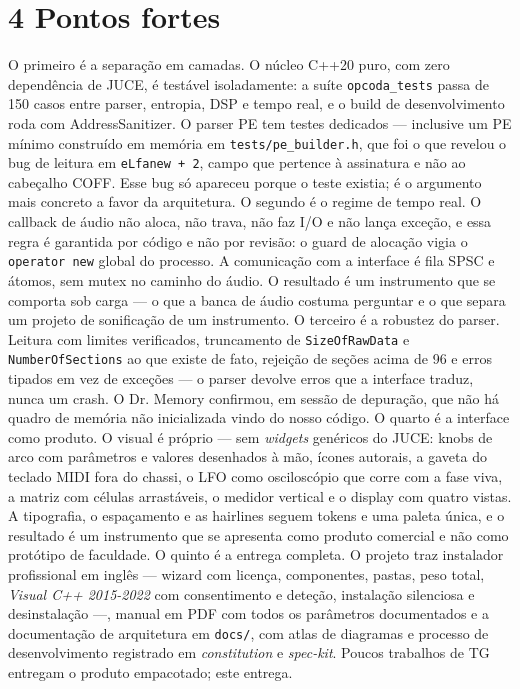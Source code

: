 \documentclass[11pt,a4paper]{article}
\newcommand{\code}[1]{\texttt{\small #1}}
\begin{document}
\section*{4 Pontos fortes}
O primeiro é a separação em camadas. O núcleo C++20 puro, com zero dependência de JUCE, é testável isoladamente: a suíte \code{opcoda\_tests} passa de 150 casos entre parser, entropia, DSP e tempo real, e o build de desenvolvimento roda com AddressSanitizer. O parser PE tem testes dedicados --- inclusive um PE mínimo construído em memória em \code{tests/pe\_builder.h}, que foi o que revelou o bug de leitura em \code{eLfanew + 2}, campo que pertence à assinatura e não ao cabeçalho COFF. Esse bug só apareceu porque o teste existia; é o argumento mais concreto a favor da arquitetura. O segundo é o regime de tempo real. O callback de áudio não aloca, não trava, não faz I/O e não lança exceção, e essa regra é garantida por código e não por revisão: o guard de alocação vigia o \code{operator new} global do processo. A comunicação com a interface é fila SPSC e átomos, sem mutex no caminho do áudio. O resultado é um instrumento que se comporta sob carga --- o que a banca de áudio costuma perguntar e o que separa um projeto de sonificação de um instrumento. O terceiro é a robustez do parser. Leitura com limites verificados, truncamento de \code{SizeOfRawData} e \code{NumberOfSections} ao que existe de fato, rejeição de seções acima de 96 e erros tipados em vez de exceções --- o parser devolve erros que a interface traduz, nunca um crash. O Dr. Memory confirmou, em sessão de depuração, que não há quadro de memória não inicializada vindo do nosso código. O quarto é a interface como produto. O visual é próprio --- sem \emph{widgets} genéricos do JUCE: knobs de arco com parâmetros e valores desenhados à mão, ícones autorais, a gaveta do teclado MIDI fora do chassi, o LFO como osciloscópio que corre com a fase viva, a matriz com células arrastáveis, o medidor vertical e o display com quatro vistas. A tipografia, o espaçamento e as hairlines seguem tokens e uma paleta única, e o resultado é um instrumento que se apresenta como produto comercial e não como protótipo de faculdade. O quinto é a entrega completa. O projeto traz instalador profissional em inglês --- wizard com licença, componentes, pastas, peso total, \emph{Visual C++ 2015-2022} com consentimento e deteção, instalação silenciosa e desinstalação ---, manual em PDF com todos os parâmetros documentados e a documentação de arquitetura em \code{docs/}, com atlas de diagramas e processo de desenvolvimento registrado em \emph{constitution} e \emph{spec-kit}. Poucos trabalhos de TG entregam o produto empacotado; este entrega.
\end{document}
